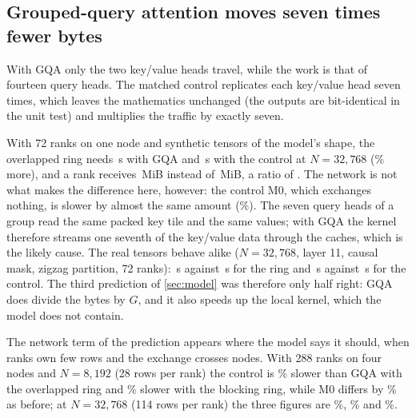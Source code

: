 \subsection{Grouped-query attention moves seven times fewer bytes}\label{sec:gqa}
With GQA only the two key/value heads travel, while the work is that of fourteen
query heads. The matched control replicates each key/value head seven times, which
leaves the mathematics unchanged (the outputs are bit-identical in the unit test)
and multiplies the traffic by exactly seven.

With 72 ranks on one node and synthetic tensors of the model's shape, the
overlapped ring needs \,s with GQA and
\,s with the control at $N=32{,}768$
(\% more), and a rank receives
\,MiB instead of \,MiB, a ratio of
. The network is not what makes the difference here,
however: the control M0, which exchanges nothing, is slower by almost the same
amount (\%). The seven query heads of a group read
the same packed key tile and the same values; with GQA the kernel therefore streams
one seventh of the key/value data through the caches, which is the likely cause. The real tensors behave alike
($N=32{,}768$, layer 11, causal mask, zigzag partition, 72 ranks):
\,s against \,s for the ring
and \,s against \,s for the
control. The third prediction of \cref{sec:model} was therefore only half right:
GQA does divide the bytes by $G$, and it also speeds up the local kernel, which
the model does not contain.

The network term of the prediction appears where the model says it should, when
ranks own few rows and the exchange crosses nodes. With 288 ranks on four nodes and
$N=8{,}192$ (28 rows per rank) the control is \%
slower than GQA with the overlapped ring and \% slower
with the blocking ring, while M0 differs by \% as
before; at $N=32{,}768$ (114 rows per rank) the three figures are
\%, \% and
\%.

